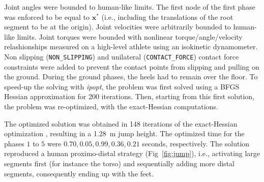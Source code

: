 Joint angles were bounded to human-like limits.
The first node of the first phase was enforced to be equal to $\mathbf{x^*}$ (i.e., including the translations of the root segment to be at the origin). 
Joint velocities were arbitrarily bounded to human-like limits.
Joint torques were bounded with nonlinear torque/angle/velocity relashionships measured on a high-level athlete using an isokinetic dynamometer. 
Non slipping (\texttt{NON\_SLIPPING}) and unilateral (\texttt{CONTACT\_FORCE}) contact force constraints were added to prevent the contact points from slipping and pulling on the ground.
During the ground phases, the heels had to remain over the floor.
To speed-up the solving with \emph{ipopt}, the problem was first solved using a BFGS Hessian approximation for 200 iterations.
Then, starting from this first solution, the problem was re-optimized, with the exact-Hessian computations.

The optimized solution was obtained in 148 iterations of the exact-Hessian optimization , resulting in a \SI{1.28}{\meter} jump height.
The optimized time for the phases $1$ to $5$ were $0.70, 0.05, 0.99, 0.36, 0.21$ seconds, respectively.
The solution reproduced a human proximo-distal strategy (Fig~\ref{fig:jump}), i.e., activating large segments first (for instance the torso) and sequentially adding more distal segments, consequently ending up with the feet.
